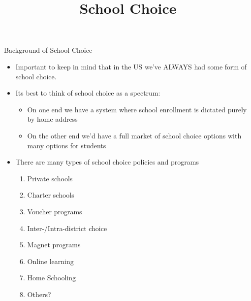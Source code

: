 \documentclass{beamer}
\title{School Choice}
\begin{document}
\maketitle

\begin{frame}[<+->]{Background of School Choice}
	\begin{itemize}
		\item Important to keep in mind that in the US we've ALWAYS had some form of school choice. 
		\item Its best to think of school choice as a spectrum:
		\begin{itemize}
			\item On one end we have a system where school enrollment is dictated purely by home address 
			\item On the other end we'd have a full market of school choice options with many options for students
		\end{itemize}
		\item There are many types of school choice policies and programs
			\begin{enumerate}
				\item Private schools
				\item Charter schools
				\item Voucher programs
				\item Inter-/Intra-district choice
				\item Magnet programs
				\item Online learning
				\item Home Schooling
				\item Others?
			\end{enumerate}
	\end{itemize}
\end{frame}		
\end{document}
